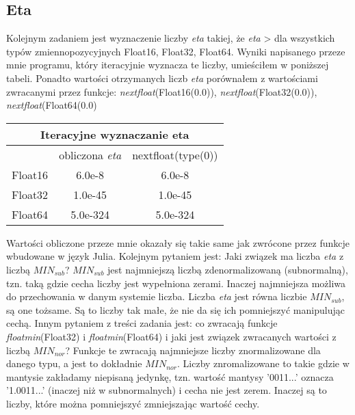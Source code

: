 \documentclass[]{article}
\begin{document}
	
	\subsection*{Eta}
	Kolejnym zadaniem jest wyznaczenie liczby \textit{eta} takiej, że \textit{eta} \textgreater{} dla wszystkich typów zmiennopozycyjnych Float16, Float32, Float64.
	Wyniki napisanego przeze mnie programu, który iteracyjnie wyznacza te liczby, umieściłem w poniższej tabeli. Ponadto wartości otrzymanych liczb \textit{eta} porównałem z wartościami zwracanymi przez funkcje: \mbox{\textit{nextfloat}(Float16(0.0))}, \mbox{\textit{nextfloat}(Float32(0.0))}, \mbox{\textit{nextfloat}(Float64(0.0)}
	
	\begin{table}[h!]
		\centering
		\label{tab:table1}
		\begin{tabular}{|c|c|c|}
			\multicolumn{3}{c}{Iteracyjne wyznaczanie eta}\\
			\hline
			& obliczona \textit{eta} & nextfloat(type(0))  \\
			\hline
			Float16 & 6.0e-8 & 6.0e-8 \\
			\hline
			Float32 & 1.0e-45 & 1.0e-45 \\
			\hline
			Float64 & 5.0e-324 & 5.0e-324 \\
			\hline
		\end{tabular}
	\end{table}

	Wartości obliczone przeze mnie okazały się takie same jak zwrócone przez funkcje wbudowane w język Julia.
	Kolejnym pytaniem jest: Jaki związek ma liczba \textit{eta} z liczbą $MIN_{sub}$?\newline
	$MIN_{sub}$ jest najmniejszą liczbą zdenormalizowaną (subnormalną), tzn. taką gdzie cecha liczby jest wypełniona zerami. Inaczej najmniejsza możliwa do przechowania w danym systemie liczba. Liczba \textit{eta} jest równa liczbie $MIN_{sub}$, są one tożsame. Są to liczby tak małe, że nie da się ich pomniejszyć manipulując cechą.
	\newline
	Innym pytaniem z treści zadania jest: co zwracają funkcje \textit{floatmin}(Float32) i \textit{floatmin}(Float64) i jaki jest związek zwracanych wartości z liczbą $MIN_{nor}$?\newline
	Funkcje te zwracają najmniejsze liczby znormalizowane dla danego typu, a jest to dokładnie $MIN_{nor}$. Liczby znromalizowane to takie gdzie w mantysie zakładamy niepisaną jedynkę, tzn. wartość mantysy '0011...' oznacza '1.0011...' (inaczej niż w subnormalnych) i cecha nie jest zerem. Inaczej są to liczby, które można pomniejszyć zmniejszając wartość cechy.
\end{document}
